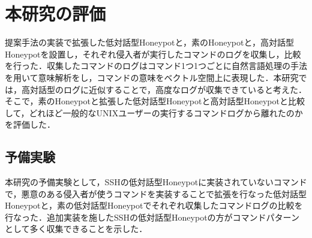 \section{本研究の評価}
\label{intr:eval}
提案手法の実装で拡張した低対話型Honeypotと，素のHoneypotと，高対話型Honeypotを設置し，それぞれ侵入者が実行したコマンドのログを収集し，比較を行った．収集したコマンドのログはコマンド1つ1つごとに自然言語処理の手法を用いて意味解析をし，コマンドの意味をベクトル空間上に表現した．本研究では，高対話型のログに近似することで，高度なログが収集できていると考えた．そこで，素のHoneypotと拡張した低対話型Honeypotと高対話型Honeypotと比較して，どれほど一般的なUNIXユーザーの実行するコマンドログから離れたのかを評価した．

\subsection{予備実験}
\label{intr:prex}
本研究の予備実験として，SSHの低対話型Honeypotに実装されていないコマンドで，悪意のある侵入者が使うコマンドを実装することで拡張を行なった低対話型Honeypotと，素の低対話型Honeypotでそれぞれ収集したコマンドログの比較を行なった．追加実装を施したSSHの低対話型Honeypotの方がコマンドパターンとして多く収集できることを示した．







